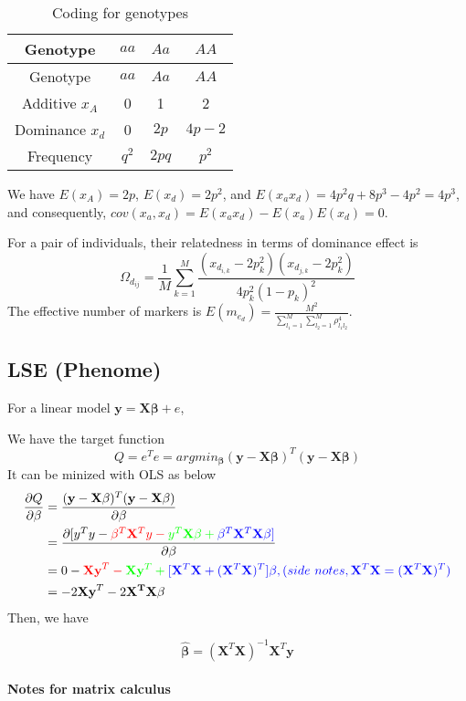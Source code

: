 \documentclass[]{article}
\let\oldparagraph\paragraph
\renewcommand{\paragraph}[1]{\oldparagraph{#1}\mbox{}}
\begin{document}
\begin{longtable}[]{@{}cccc@{}}
\caption{Coding for genotypes}\tabularnewline
\toprule
Genotype & \(aa\) & \(Aa\) & \(AA\)\tabularnewline
\midrule
\endfirsthead
\toprule
Genotype & \(aa\) & \(Aa\) & \(AA\)\tabularnewline
\midrule
\endhead
Additive \(x_A\) & 0 & 1 & 2\tabularnewline
Dominance \(x_d\) & 0 & \(2p\) & \(4p-2\)\tabularnewline
Frequency & \(q^2\) & \(2pq\) & \(p^2\)\tabularnewline
\bottomrule
\end{longtable}

We have \(E(x_A)=2p\), \(E(x_d)=2p^2\), and
\(E(x_ax_d)=4p^2q+8p^3-4p^2=4p^3\), and consequently,
\(cov(x_a, x_d)=E(x_ax_d)-E(x_a)E(x_d)=0\).

For a pair of individuals, their relatedness in terms of dominance
effect is \[
\Omega_{d_{ij}}=\frac{1}{M}\sum_{k=1}^M\frac{(x_{d_{i,k}}-2p_k^2)(x_{d_{j,k}}-2p_k^2)}{4p_k^2(1-p_k)^2}
\] The effective number of markers is
\(E(m_{e_d})=\frac{M^2}{\sum_{l_1=1}^M\sum_{l_2=1}^M\rho_{l_1l_2}^4}\).

\hypertarget{lse-phenome}{%
\subsection{LSE (Phenome)}\label{lse-phenome}}

For a linear model \(\mathbf{y}=\mathbf{X\beta}+e\),

We have the target function
\[Q=e^Te=argmin_{\mathbf{\beta}}(\mathbf{y}-\mathbf{X\beta})^T(\mathbf{y}-\mathbf{X\beta})\]
It can be minized with OLS as below \[\begin{align}
\frac{\partial Q}{\partial \beta}&=\frac{(\mathbf{y}-\mathbf{X\beta})^T(\mathbf{y}-\mathbf{X\beta})}{\partial \beta}\\
&=\frac{\partial [y^Ty-\color{red}{\mathbf{\beta}^T\mathbf{X}^Ty}-\color{green}{y^T\mathbf{X\beta}}+\color{blue}{\mathbf{\beta}^T\mathbf{X}^T\mathbf{X}\beta}]}{\partial \mathbf{\beta}}\\
&=0-\color{red}{\mathbf{Xy}^T}-\color{green}{\mathbf{X}\mathbf{y}^T}+\color{blue}{[\mathbf{X}^T\mathbf{X}+(\mathbf{X}^T\mathbf{X})^T]\mathbf{\beta}}, (side\ notes, \mathbf{X}^T\mathbf{X}=(\mathbf{X}^T\mathbf{X})^T)\\
&=-2\mathbf{Xy}^T-2\mathbf{X^TX}\beta
\end{align}
\] Then, we have

\[\hat{\mathbf{\beta}}=(\mathbf{X}^T\mathbf{X})^{-1}\mathbf{X}^T\mathbf{y}\]

\hypertarget{notes-for-matrix-calculus}{%
\paragraph{Notes for matrix calculus}\label{notes-for-matrix-calculus}}
\end{document}
